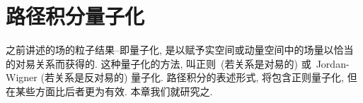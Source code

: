 
\section{路径积分量子化}

之前讲述的场的粒子结果--即量子化, 是以赋予实空间或动量空间中的场量以恰当的对易关系而获得的. 这种量子化的方法, 叫正则~(若关系是对易的) 或~Jordan-Wigner (若关系是反对易的) 量子化. 路径积分的表述形式, 将包含正则量子化, 但在某些方面比后者更为有效. 本章我们就研究之.









